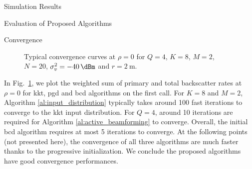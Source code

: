 \documentclass[journal]{IEEEtran}
\begin{document}
\begin{section}{Simulation Results}
\begin{subsection}{Evaluation of Proposed Algorithms}
		\begin{subsubsection}{Convergence}
			\begin{figure}[!t]
				\centering
				\resizebox{0.75\columnwidth}{!}{
					
				}
				\caption{Typical convergence curves at $\rho=0$ for $Q=4$, $K=8$, $M=2$, $N=20$, $\sigma_v^2=\SI{-40}{\dBm}$ and $r=\SI{2}{\meter}$.}
				\label{fg:wsr_convergence}
			\end{figure}

			In Fig.~\ref{fg:wsr_convergence}, we plot the weighted sum of primary and total backscatter rates at $\rho=0$ for \gls{kkt}, \gls{pgd} and \gls{bcd} algorithms on the first call.
			For $K=8$ and $M=2$, Algorithm \ref{al:input_distribution} typically takes around \num{100} fast iterations to converge to the \gls{kkt} input distribution.
			For $Q=4$, around \num{10} iterations are required for Algorithm \ref{al:active_beamforming} to converge.
			Overall, the initial \gls{bcd} algorithm requires at most \num{5} iterations to converge.
			At the following points (not presented here), the convergence of all three algorithms are much faster thanks to the progressive initialization.
			We conclude the proposed algorithms have good convergence performances.
		\end{subsubsection}
	\end{subsection}


\end{section}
\end{document}
